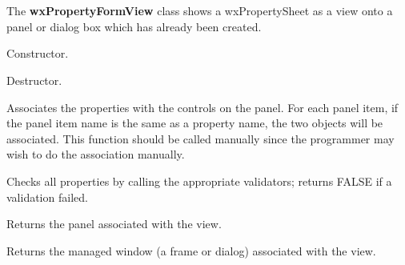 \section{}\label{wxpropertyformview}


The {\bf wxPropertyFormView} class shows a wxPropertySheet as a view onto a panel or dialog
box which has already been created.



Constructor.



Destructor.

\label{wxpropertyformviewassociatenames}


Associates the properties with the controls on the panel. For each panel item, if the
panel item name is the same as a property name, the two objects will be associated.
This function should be called manually since the programmer may wish to do the
association manually.

\label{wxpropertyformviewcheck}


Checks all properties by calling the appropriate validators; returns FALSE if a validation failed.

\label{wxpropertyformviewgetpanel}


Returns the panel associated with the view.

\label{wxpropertyformviewgetmanagedwindow}


Returns the managed window (a frame or dialog) associated with the view.

\label{wxpropertyformviewonok}


